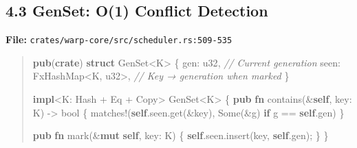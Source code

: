 \documentclass[11pt]{book}
\newenvironment{Shaded}{\begin{quote}}{\end{quote}}
\newcommand{\BuiltInTok}[1]{\textcolor[rgb]{0.00,0.50,0.00}{#1}}
\newcommand{\CommentTok}[1]{\textcolor[rgb]{0.38,0.63,0.69}{\textit{#1}}}
\newcommand{\ConstantTok}[1]{\textcolor[rgb]{0.53,0.00,0.00}{#1}}
\newcommand{\ControlFlowTok}[1]{\textcolor[rgb]{0.00,0.44,0.13}{\textbf{#1}}}
\newcommand{\DataTypeTok}[1]{\textcolor[rgb]{0.56,0.13,0.00}{#1}}
\newcommand{\KeywordTok}[1]{\textcolor[rgb]{0.00,0.44,0.13}{\textbf{#1}}}
\newcommand{\NormalTok}[1]{#1}
\newcommand{\OperatorTok}[1]{\textcolor[rgb]{0.40,0.40,0.40}{#1}}
\newcommand{\PreprocessorTok}[1]{\textcolor[rgb]{0.74,0.48,0.00}{#1}}
\begin{document}
\subsection{4.3 GenSet: O(1) Conflict Detection}

\textbf{File:} \texttt{crates/warp-core/src/scheduler.rs:509-535}

\begin{Shaded}
\begin{Highlighting}[]
\KeywordTok{pub}\NormalTok{(}\KeywordTok{crate}\NormalTok{) }\KeywordTok{struct}\NormalTok{ GenSet}\OperatorTok{\textless{}}\NormalTok{K}\OperatorTok{\textgreater{}} \OperatorTok{\{}
\NormalTok{    gen}\OperatorTok{:} \DataTypeTok{u32}\OperatorTok{,}                    \CommentTok{// Current generation}
\NormalTok{    seen}\OperatorTok{:}\NormalTok{ FxHashMap}\OperatorTok{\textless{}}\NormalTok{K}\OperatorTok{,} \DataTypeTok{u32}\OperatorTok{\textgreater{},}     \CommentTok{// Key → generation when marked}
\OperatorTok{\}}

\KeywordTok{impl}\OperatorTok{\textless{}}\NormalTok{K}\OperatorTok{:} \BuiltInTok{Hash} \OperatorTok{+} \BuiltInTok{Eq} \OperatorTok{+} \BuiltInTok{Copy}\OperatorTok{\textgreater{}}\NormalTok{ GenSet}\OperatorTok{\textless{}}\NormalTok{K}\OperatorTok{\textgreater{}} \OperatorTok{\{}
    \KeywordTok{pub} \KeywordTok{fn}\NormalTok{ contains(}\OperatorTok{\&}\KeywordTok{self}\OperatorTok{,}\NormalTok{ key}\OperatorTok{:}\NormalTok{ K) }\OperatorTok{{-}\textgreater{}} \DataTypeTok{bool} \OperatorTok{\{}
        \PreprocessorTok{matches!}\NormalTok{(}\KeywordTok{self}\OperatorTok{.}\NormalTok{seen}\OperatorTok{.}\NormalTok{get(}\OperatorTok{\&}\NormalTok{key)}\OperatorTok{,} \ConstantTok{Some}\NormalTok{(}\OperatorTok{\&}\NormalTok{g) }\ControlFlowTok{if}\NormalTok{ g }\OperatorTok{==} \KeywordTok{self}\OperatorTok{.}\NormalTok{gen)}
    \OperatorTok{\}}

    \KeywordTok{pub} \KeywordTok{fn}\NormalTok{ mark(}\OperatorTok{\&}\KeywordTok{mut} \KeywordTok{self}\OperatorTok{,}\NormalTok{ key}\OperatorTok{:}\NormalTok{ K) }\OperatorTok{\{}
        \KeywordTok{self}\OperatorTok{.}\NormalTok{seen}\OperatorTok{.}\NormalTok{insert(key}\OperatorTok{,} \KeywordTok{self}\OperatorTok{.}\NormalTok{gen)}\OperatorTok{;}
    \OperatorTok{\}}
\OperatorTok{\}}
\end{Highlighting}
\end{Shaded}
\end{document}
